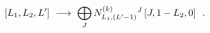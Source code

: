 \begin{equation}\label{mmDAflowII}
[L_{1},L_{2},L']\ \longrightarrow \ \makebox[6cm][l]{$\displaystyle \bigoplus_{J}
N^{(k)}_{L_{1},(L'-1)}{}^{J}\, [J,1-L_{2},0] \ \ .$}
\end{equation}

